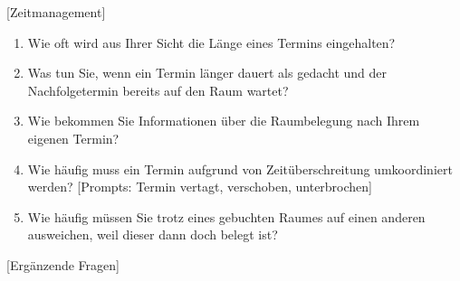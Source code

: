 [Zeitmanagement]

\begin{enumerate}

    \item Wie oft wird aus Ihrer Sicht die Länge eines Termins eingehalten?
    
    \item Was tun Sie, wenn ein Termin länger dauert als gedacht und der Nachfolgetermin bereits auf den Raum wartet?
    
    \item Wie bekommen Sie Informationen über die Raumbelegung nach Ihrem eigenen Termin? 
    
    \item Wie häufig muss ein Termin aufgrund von Zeitüberschreitung umkoordiniert werden? [Prompts: Termin vertagt, verschoben, unterbrochen]

    \item Wie häufig müssen Sie trotz eines gebuchten Raumes auf einen anderen ausweichen, weil dieser dann doch belegt ist? 

\end{enumerate}

[Ergänzende Fragen]

